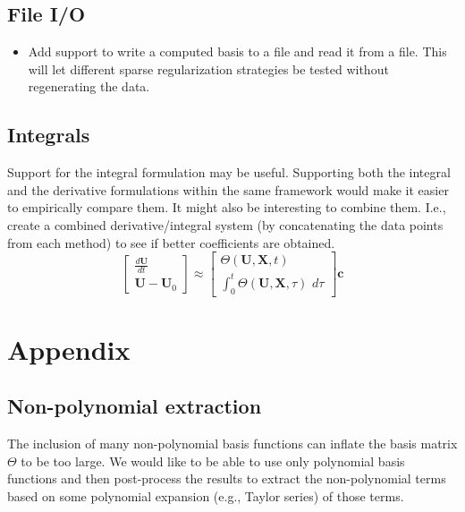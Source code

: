 \documentclass{article}
\let\vec\mathbf
\begin{document}
\subsection{File I/O}

\begin{itemize}
    \item Add support to write a computed basis to a file and read it from a
      file. This will let different sparse regularization strategies be tested
      without regenerating the data.
\end{itemize}

\subsection{Integrals}

Support for the integral formulation may be useful. Supporting both the integral
and the derivative formulations within the same framework would make it easier
to empirically compare them. It might also be interesting to combine them. I.e.,
create a combined derivative/integral system (by concatenating the data points
from each method) to see if better coefficients are obtained.
\begin{equation*}
\begin{bmatrix}
\frac{d\vec{U}}{dt} \\ \vec{U} - \vec{U}_0
\end{bmatrix}
\approx
\begin{bmatrix}
\Theta(\vec{U}, \vec{X}, t) \\ \int_0^t \Theta(\vec{U}, \vec{X}, \tau) \,\, d\tau
\end{bmatrix}
\vec{c}
\end{equation*}





\pagebreak

\section{Appendix}

\subsection{Non-polynomial extraction}

The inclusion of many non-polynomial basis functions can inflate the basis
matrix $\Theta$ to be too large. We would like to be able to use only polynomial
basis functions and then post-process the results to extract the non-polynomial
terms based on some polynomial expansion (e.g., Taylor series) of those terms.
\end{document}
